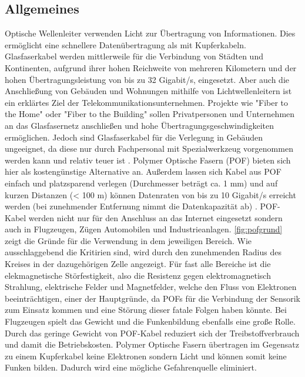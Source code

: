 \subsection{Allgemeines}
\label{subsec:pofallgemeines}

Optische Wellenleiter verwenden Licht zur Übertragung von Informationen. Dies
ermöglicht eine schnellere Datenübertragung als mit Kupferkabeln. Glasfaserkabel
werden mittlerweile für die Verbindung von Städten und Kontinenten, aufgrund
ihrer hohen Reichweite von mehreren Kilometern und der hohen
Übertragungsleistung von bis zu 32 Gigabit/s, eingesetzt. Aber auch die
Anschließung von Gebäuden und Wohnungen mithilfe von Lichtwellenleitern ist ein
erklärtes Ziel der Telekommunikationsunternehmen. Projekte wie
"Fiber to the Home" oder "Fiber
to the Building" sollen Privatpersonen und Unternehmen an das
Glasfasernetz anschließen und hohe Übertragungsgeschwindigkeiten ermöglichen.
Jedoch sind Glasfaserkabel für die Verlegung in Gebäuden ungeeignet, da diese
nur durch Fachpersonal mit Spezialwerkzeug vorgenommen werden kann und relativ
teuer ist \cite{poflan}. Polymer Optische Fasern (POF) bieten sich hier als
kostengünstige Alternative an. Außerdem lassen sich Kabel aus POF einfach und
platzsparend verlegen (Durchmesser beträgt ca. 1 mm) und auf kurzen Distanzen (<
100 m) können Datenraten von bis zu 10 Gigabit/s \cite{pofacgif} erreicht werden
(bei zunehmender Entfernung nimmt die Datenkapazität ab) \cite{pofacprofile}.
POF-Kabel werden nicht nur für den Anschluss an das Internet eingesetzt sondern
auch in Flugzeugen, Zügen Automobilen und Industrieanlagen.
\autoref{fig:pofgrund} zeigt die Gründe für die Verwendung in dem jeweiligen
Bereich. Wie ausschlaggebend die Kritirien sind, wird durch den zunehmenden
Radius des Kreises in der dazugehörigen Zelle angezeigt. Für fast alle Bereiche
ist die elekmagnetische Störfestigkeit, also die Resistenz gegen
elektromagnetisch Strahlung, elektrische Felder und Magnetfelder, welche den
Fluss von Elektronen beeinträchtigen, einer der Hauptgründe, da POFs für die
Verbindung der Sensorik zum Einsatz kommen und eine Störung dieser fatale Folgen
haben könnte. Bei Flugzeugen spielt das Gewicht und die Funkenbildung ebenfalls
eine große Rolle. Durch das geringe Gewicht von POF-Kabel reduziert sich der
Treibstoffverbrauch und damit die Betriebskosten. Polymer Optische Fasern
übertragen im Gegensatz zu einem Kupferkabel keine Elektronen sondern Licht und
können somit keine Funken bilden. Dadurch wird eine mögliche Gefahrenquelle
eliminiert.

